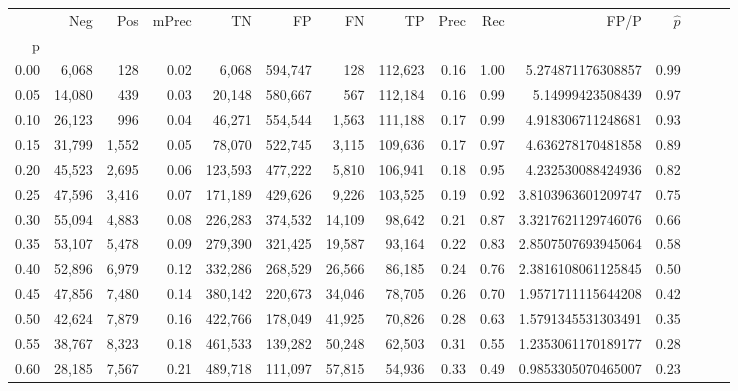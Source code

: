 \begin{tabular}{rrrrrrrrrrrrrrr}
\toprule
{} &     Neg &    Pos & mPrec &       TN &       FP &       FN &       TP &  Prec &   Rec &                 FP/P & $\hat{p}$ \\
p    &         &        &       &          &          &          &          &       &       &                      &           \\
\midrule
0.00 &   6,068 &    128 &  0.02 &    6,068 &  594,747 &      128 &  112,623 &  0.16 &  1.00 &    5.274871176308857 &      0.99 \\
0.05 &  14,080 &    439 &  0.03 &   20,148 &  580,667 &      567 &  112,184 &  0.16 &  0.99 &     5.14999423508439 &      0.97 \\
0.10 &  26,123 &    996 &  0.04 &   46,271 &  554,544 &    1,563 &  111,188 &  0.17 &  0.99 &    4.918306711248681 &      0.93 \\
0.15 &  31,799 &  1,552 &  0.05 &   78,070 &  522,745 &    3,115 &  109,636 &  0.17 &  0.97 &    4.636278170481858 &      0.89 \\
0.20 &  45,523 &  2,695 &  0.06 &  123,593 &  477,222 &    5,810 &  106,941 &  0.18 &  0.95 &    4.232530088424936 &      0.82 \\
0.25 &  47,596 &  3,416 &  0.07 &  171,189 &  429,626 &    9,226 &  103,525 &  0.19 &  0.92 &   3.8103963601209747 &      0.75 \\
0.30 &  55,094 &  4,883 &  0.08 &  226,283 &  374,532 &   14,109 &   98,642 &  0.21 &  0.87 &   3.3217621129746076 &      0.66 \\
0.35 &  53,107 &  5,478 &  0.09 &  279,390 &  321,425 &   19,587 &   93,164 &  0.22 &  0.83 &   2.8507507693945064 &      0.58 \\
0.40 &  52,896 &  6,979 &  0.12 &  332,286 &  268,529 &   26,566 &   86,185 &  0.24 &  0.76 &   2.3816108061125845 &      0.50 \\
0.45 &  47,856 &  7,480 &  0.14 &  380,142 &  220,673 &   34,046 &   78,705 &  0.26 &  0.70 &   1.9571711115644208 &      0.42 \\
0.50 &  42,624 &  7,879 &  0.16 &  422,766 &  178,049 &   41,925 &   70,826 &  0.28 &  0.63 &   1.5791345531303491 &      0.35 \\
0.55 &  38,767 &  8,323 &  0.18 &  461,533 &  139,282 &   50,248 &   62,503 &  0.31 &  0.55 &   1.2353061170189177 &      0.28 \\
0.60 &  28,185 &  7,567 &  0.21 &  489,718 &  111,097 &   57,815 &   54,936 &  0.33 &  0.49 &   0.9853305070465007 &      0.23 \\

\end{tabular}

